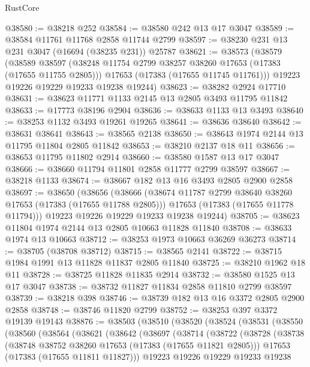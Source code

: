 \begin{lexlean}{RustCore}
\begin{coremodule}
@38580 := @38218 @252
@38584 := @38580 @242 @13 @17 @3047
@38589 := @38584 @11761 @11768 @2858 @11744 @2799
@38597 := @38230 @231 @13 @231 @3047 (@16694 (@38235 @231)) @25787
@38621 := @38573
    (@38579
      (@38589
        @38597
        (@38248 @11754 @2799 @38257 @38260 @17653 (@17383 (@17655 @11755 @2805)))
        @17653
        (@17383 (@17655 @11745 @11761)))
      @19223
      @19226
      @19229
      @19233
      @19238
      @19244)
@38623 := @38282 @2924 @17710
@38631 := @38623 @11771 @1133 @2145 @13 @2805 @3493 @11795 @11842
@38633 := @17773 @38196 @2904
@38636 := @38633 @1133 @13 @3493
@38640 := @38253 @1132 @3493 @19261 @19265
@38641 := @38636 @38640
@38642 := @38631 @38641
@38643 := @38565 @2138
@38650 := @38643 @1974 @2144 @13 @11795 @11804 @2805 @11842
@38653 := @38210 @2137 @18 @11
@38656 := @38653 @11795 @11802 @2914
@38660 := @38580 @1587 @13 @17 @3047
@38666 := @38660 @11794 @11801 @2858 @11777 @2799 @38597
@38667 := @38218 @1133
@38674 := @38667 @182 @13 @16 @3493 @2805 @2900 @2858
@38697 := @38650
    (@38656
      (@38666
        (@38674 @11787 @2799 @38640 @38260 @17653 (@17383 (@17655 @11788 @2805)))
        @17653
        (@17383 (@17655 @11778 @11794)))
      @19223
      @19226
      @19229
      @19233
      @19238
      @19244)
@38705 := @38623 @11804 @1974 @2144 @13 @2805 @10663 @11828 @11840
@38708 := @38633 @1974 @13 @10663
@38712 := @38253 @1973 @10663 @36269 @36273
@38714 := @38705 (@38708 @38712)
@38715 := @38565 @2141
@38722 := @38715 @1984 @1991 @13 @11828 @11837 @2805 @11840
@38725 := @38210 @1962 @18 @11
@38728 := @38725 @11828 @11835 @2914
@38732 := @38580 @1525 @13 @17 @3047
@38738 := @38732 @11827 @11834 @2858 @11810 @2799 @38597
@38739 := @38218 @398
@38746 := @38739 @182 @13 @16 @3372 @2805 @2900 @2858
@38748 := @38746 @11820 @2799
@38752 := @38253 @397 @3372 @19139 @19143
@38876 := @38503
    (@38510
      (@38520
        (@38524
          (@38531
            (@38550
              (@38560
                (@38564
                  (@38621
                    (@38642
                      (@38697
                        (@38714
                          (@38722
                            (@38728
                              (@38738
                                (@38748 @38752 @38260 @17653 (@17383 (@17655 @11821 @2805)))
                                @17653
                                (@17383 (@17655 @11811 @11827)))
                              @19223
                              @19226
                              @19229
                              @19233
                              @19238

\end{coremodule}
\end{lexlean}
